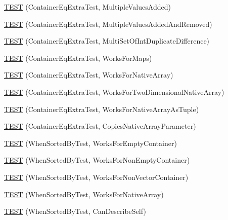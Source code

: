 \begin{DoxyCompactItemize}
\item 
\hyperlink{namespacetesting_1_1gmock__matchers__test_acc28beb0f3d3fbd8923bad7eb08ce6a6}{T\+E\+ST} (Container\+Eq\+Extra\+Test, Multiple\+Values\+Added)
\item 
\hyperlink{namespacetesting_1_1gmock__matchers__test_acb0d845f828c2d5a551e4db0611f2853}{T\+E\+ST} (Container\+Eq\+Extra\+Test, Multiple\+Values\+Added\+And\+Removed)
\item 
\hyperlink{namespacetesting_1_1gmock__matchers__test_a6bce9564bb713ffb690b776e35d2e6cf}{T\+E\+ST} (Container\+Eq\+Extra\+Test, Multi\+Set\+Of\+Int\+Duplicate\+Difference)
\item 
\hyperlink{namespacetesting_1_1gmock__matchers__test_ab7bcbeeeb23094cff6f2882304c05134}{T\+E\+ST} (Container\+Eq\+Extra\+Test, Works\+For\+Maps)
\item 
\hyperlink{namespacetesting_1_1gmock__matchers__test_ae5e5420340c8cf91d24af11feca669b0}{T\+E\+ST} (Container\+Eq\+Extra\+Test, Works\+For\+Native\+Array)
\item 
\hyperlink{namespacetesting_1_1gmock__matchers__test_a3cf0d2f2c08e34ca0b7e11ff27b4a7ca}{T\+E\+ST} (Container\+Eq\+Extra\+Test, Works\+For\+Two\+Dimensional\+Native\+Array)
\item 
\hyperlink{namespacetesting_1_1gmock__matchers__test_a94e4a2a02cde84ac51e37cda1813bc77}{T\+E\+ST} (Container\+Eq\+Extra\+Test, Works\+For\+Native\+Array\+As\+Tuple)
\item 
\hyperlink{namespacetesting_1_1gmock__matchers__test_af7a978384d567d133240fb1899ec1658}{T\+E\+ST} (Container\+Eq\+Extra\+Test, Copies\+Native\+Array\+Parameter)
\item 
\hyperlink{namespacetesting_1_1gmock__matchers__test_a9d88fbc6e2d01b66a1c10b192b25a802}{T\+E\+ST} (When\+Sorted\+By\+Test, Works\+For\+Empty\+Container)
\item 
\hyperlink{namespacetesting_1_1gmock__matchers__test_a3095e5533ec12a67377dec6b0769d9a8}{T\+E\+ST} (When\+Sorted\+By\+Test, Works\+For\+Non\+Empty\+Container)
\item 
\hyperlink{namespacetesting_1_1gmock__matchers__test_a24d3caacabfef918b7a5b9dacc5e3a66}{T\+E\+ST} (When\+Sorted\+By\+Test, Works\+For\+Non\+Vector\+Container)
\item 
\hyperlink{namespacetesting_1_1gmock__matchers__test_a33b65fc6db83270b5c29073dbbf69c4e}{T\+E\+ST} (When\+Sorted\+By\+Test, Works\+For\+Native\+Array)
\item 
\hyperlink{namespacetesting_1_1gmock__matchers__test_afc2d1e86837d8e3103748cb2e96b61c3}{T\+E\+ST} (When\+Sorted\+By\+Test, Can\+Describe\+Self)

\end{DoxyCompactItemize}
